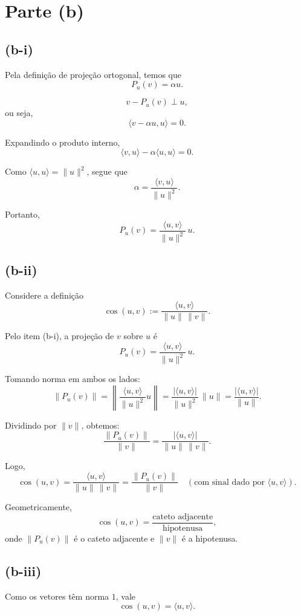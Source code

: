 
\section*{Parte (b)}

\subsection*{(b-i)}

Pela definição de projeção ortogonal, temos que
\[
    P_u(v) = \alpha u.
\]

\[
    v - P_u(v) \perp u,
\]
ou seja,
\[
    \langle v - \alpha u, u \rangle = 0.
\]

Expandindo o produto interno,
\[
    \langle v, u \rangle - \alpha \langle u, u \rangle = 0.
\]

Como $\langle u, u \rangle = \|u\|^2$, segue que
\[
    \alpha = \frac{\langle v, u \rangle}{\|u\|^2}.
\]

Portanto,
\[
    P_u(v) = \frac{\langle u, v \rangle}{\|u\|^2}\, u.
\]

\subsection*{(b-ii)}
Considere a definição
\[
    \cos(u,v) := \frac{\langle u, v \rangle}{\|u\|\,\|v\|}.
\]

Pelo item (b-i), a projeção de $v$ sobre $u$ é
\[
    P_u(v) = \frac{\langle u, v\rangle}{\|u\|^2}\, u.
\]

Tomando norma em ambos os lados:
\[
    \|P_u(v)\|
    = \left\|\frac{\langle u, v\rangle}{\|u\|^2} u \right\|
    = \frac{|\langle u, v\rangle|}{\|u\|^2}\,\|u\|
    = \frac{|\langle u, v\rangle|}{\|u\|}.
\]

Dividindo por $\|v\|$, obtemos:
\[
    \frac{\|P_u(v)\|}{\|v\|}
    =
    \frac{|\langle u, v\rangle|}{\|u\|\,\|v\|}.
\]

Logo,
\[
    \cos(u,v)
    =
    \frac{\langle u, v\rangle}{\|u\|\,\|v\|}
    =
    \frac{\|P_u(v)\|}{\|v\|}
    \quad (\text{com sinal dado por } \langle u,v\rangle).
\]

Geometricamente,
\[
    \cos(u,v)
    =
    \frac{\text{cateto adjacente}}{\text{hipotenusa}},
\]
onde $\|P_u(v)\|$ é o cateto adjacente e $\|v\|$ é a hipotenusa.

\subsection*{(b-iii)}


Como os vetores têm norma $1$, vale
\[
    \cos(u,v)=\langle u,v\rangle.
\]

